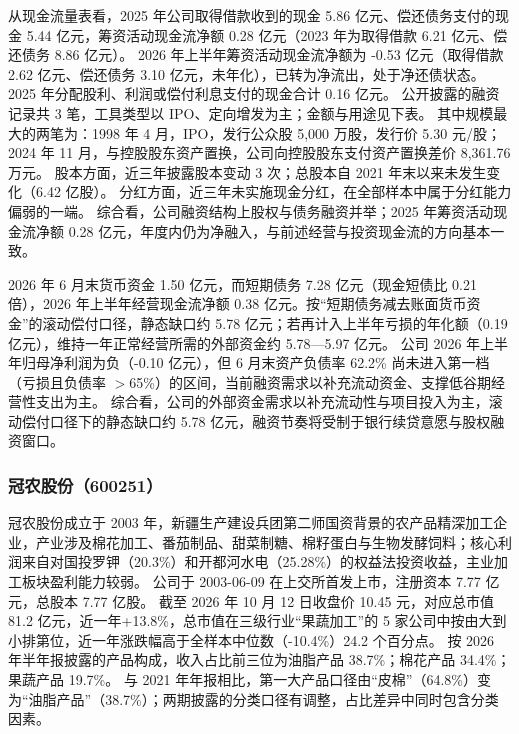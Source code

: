  从现金流量表看，2025 年公司取得借款收到的现金 5.86 亿元、偿还债务支付的现金 5.44 亿元，筹资活动现金流净额 0.28 亿元（2023 年为取得借款 6.21 亿元、偿还债务 8.86 亿元）。 2026 年上半年筹资活动现金流净额为 -0.53 亿元（取得借款 2.62 亿元、偿还债务 3.10 亿元，未年化），已转为净流出，处于净还债状态。 2025 年分配股利、利润或偿付利息支付的现金合计 0.16 亿元。 公开披露的融资记录共 3 笔，工具类型以 IPO、定向增发为主；金额与用途见下表。 其中规模最大的两笔为：1998 年 4 月，IPO，发行公众股 5,000 万股，发行价 5.30 元/股；2024 年 11 月，与控股股东资产置换，公司向控股股东支付资产置换差价 8,361.76 万元。 股本方面，近三年披露股本变动 3 次；总股本自 2021 年末以来未发生变化（6.42 亿股）。 分红方面，近三年未实施现金分红，在全部样本中属于分红能力偏弱的一端。 综合看，公司融资结构上股权与债务融资并举；2025 年筹资活动现金流净额 0.28 亿元，年度内仍为净融入，与前述经营与投资现金流的方向基本一致。

 2026 年 6 月末货币资金 1.50 亿元，而短期债务 7.28 亿元（现金短债比 0.21 倍），2026 年上半年经营现金流净额 0.38 亿元。按“短期债务减去账面货币资金”的滚动偿付口径，静态缺口约 5.78 亿元；若再计入上半年亏损的年化额（0.19 亿元），维持一年正常经营所需的外部资金约 5.78---5.97 亿元。 公司 2026 年上半年归母净利润为负（-0.10 亿元），但 6 月末资产负债率 62.2\% 尚未进入第一档（亏损且负债率 $>$65\%）的区间，当前融资需求以补充流动资金、支撑低谷期经营性支出为主。 综合看，公司的外部资金需求以补充流动性与项目投入为主，滚动偿付口径下的静态缺口约 5.78 亿元，融资节奏将受制于银行续贷意愿与股权融资窗口。




\subsubsection{冠农股份（600251）}
\label{co:600251}

 冠农股份成立于 2003 年，新疆生产建设兵团第二师国资背景的农产品精深加工企业，产业涉及棉花加工、番茄制品、甜菜制糖、棉籽蛋白与生物发酵饲料；核心利润来自对国投罗钾（20.3\%）和开都河水电（25.28\%）的权益法投资收益，主业加工板块盈利能力较弱。 公司于 2003-06-09 在上交所首发上市，注册资本 7.77 亿元，总股本 7.77 亿股。 截至 2026 年 10 月 12 日收盘价 10.45 元，对应总市值 81.2 亿元，近一年+13.8\%，总市值在三级行业“果蔬加工”的 5 家公司中按由大到小排第位，近一年涨跌幅高于全样本中位数（-10.4\%）24.2 个百分点。 按 2026 年半年报披露的产品构成，收入占比前三位为油脂产品 38.7\%；棉花产品 34.4\%；果蔬产品 19.7\%。 与 2021 年年报相比，第一大产品口径由“皮棉”（64.8\%）变为“油脂产品”（38.7\%）；两期披露的分类口径有调整，占比差异中同时包含分类因素。

